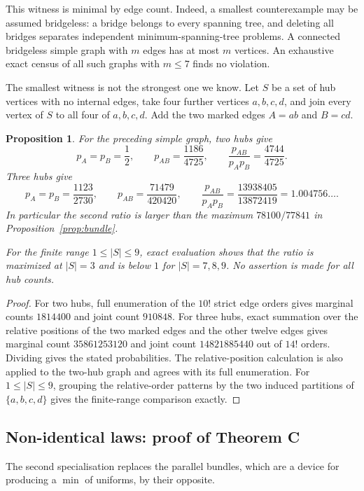 \documentclass[10pt,a4paper]{amsart}
\newtheorem{proposition}[theorem]{Proposition}
\begin{document}
This witness is minimal by edge count. Indeed, a smallest counterexample may be
assumed bridgeless: a bridge belongs to every spanning tree, and deleting all
bridges separates independent minimum-spanning-tree problems. A connected
bridgeless simple graph with $m$ edges has at most $m$ vertices. An exhaustive
exact census of all such graphs with $m\le7$ finds no violation.

The smallest witness is not the strongest one we know. Let $S$ be a set of hub
vertices with no internal edges, take four further vertices $a,b,c,d$, and join
every vertex of $S$ to all four of $a,b,c,d$. Add the two marked edges $A=ab$
and $B=cd$.

\begin{proposition}
\label{prop:hub-witnesses}
For the preceding simple graph, two hubs give
\[
p_A=p_B=\frac12,\qquad p_{AB}=\frac{1186}{4725},\qquad
\frac{p_{AB}}{p_Ap_B}=\frac{4744}{4725}.
\]
Three hubs give
\[
p_A=p_B=\frac{1123}{2730},\qquad p_{AB}=\frac{71479}{420420},\qquad
\frac{p_{AB}}{p_Ap_B}=\frac{13938405}{13872419}
   =1.004756\ldots .
\]
In particular the second ratio is larger than the maximum
$78100/77841$ in Proposition~\ref{prop:bundle}.

For the finite range $1\le |S|\le9$, exact evaluation shows that the ratio is
maximized at $|S|=3$ and is below $1$ for $|S|=7,8,9$. No assertion is made
for all hub counts.
\end{proposition}

\begin{proof}
For two hubs, full enumeration of the $10!$ strict edge orders gives marginal
counts $1814400$ and joint count $910848$. For three hubs, exact summation over
the relative positions of the two marked edges and the other twelve edges gives
marginal count $35861253120$ and joint count $14821885440$ out of $14!$ orders.
Dividing gives the stated probabilities. The relative-position calculation is
also applied to the two-hub graph and agrees with its full enumeration.
For $1\le |S|\le9$, grouping the relative-order patterns by the two induced
partitions of $\{a,b,c,d\}$ gives the finite-range comparison exactly.
\end{proof}

\subsection{Non-identical laws: proof of Theorem C}
\label{sec:nonidentical}

The second specialisation replaces the parallel bundles, which are a device for
producing a $\min$ of uniforms, by their opposite.
\end{document}
